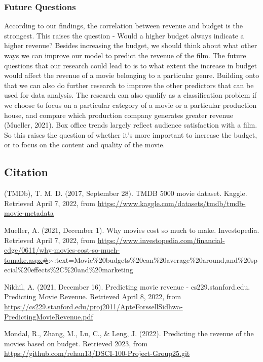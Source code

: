 \documentclass[
]{article}
\begin{document}
\hypertarget{future-questions}{%
\subsubsection{Future Questions}\label{future-questions}}

According to our findings, the correlation between revenue and budget is
the strongest. This raises the question - Would a higher budget always
indicate a higher revenue? Besides increasing the budget, we should
think about what other ways we can improve our model to predict the
revenue of the film. The future questions that our research could lead
to is to what extent the increase in budget would affect the revenue of
a movie belonging to a particular genre. Building onto that we can also
do further research to improve the other predictors that can be used for
data analysis. The research can also qualify as a classification problem
if we choose to focus on a particular category of a movie or a
particular production house, and compare which production company
generates greater revenue (Mueller, 2021). Box office trends largely
reflect audience satisfaction with a film. So this raises the question
of whether it's more important to increase the budget, or to focus on
the content and quality of the movie.

\hypertarget{citation}{%
\subsection{Citation}\label{citation}}

(TMDb), T. M. D. (2017, September 28). TMDB 5000 movie dataset. Kaggle.
Retrieved April 7, 2022, from
\url{https://www.kaggle.com/datasets/tmdb/tmdb-movie-metadata}

Mueller, A. (2021, December 1). Why movies cost so much to make.
Investopedia. Retrieved April 7, 2022, from
\url{https://www.investopedia.com/financial-edge/0611/why-movies-cost-so-much-tomake.aspx\#}:\textasciitilde:text=Movie\%20budgets\%20can\%20average\%20around,and\%20special\%20effects\%2C\%20and\%20marketing

Nikhil, A. (2021, December 16). Predicting movie revenue -
cs229.stanford.edu. Predicting Movie Revenue. Retrieved April 8, 2022,
from
\url{https://cs229.stanford.edu/proj2011/ApteForssellSidhwa-PredictingMovieRevenue.pdf}

Mondal, R., Zhang, M., Lu, C., \& Leng, J. (2022). Predicting the
revenue of the movies based on budget. Retrieved 2023, from
\url{https://github.com/rehan13/DSCI-100-Project-Group25.git}
\end{document}

